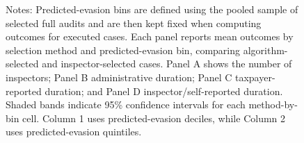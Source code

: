 \documentclass{article}
\begin{document}
\begin{figure}[H]
\begin{threeparttable}
\begin{tablenotes}
    \tiny \item Notes: Predicted-evasion bins are defined using the pooled sample of selected full audits and are then kept fixed when computing outcomes for executed cases. Each panel reports mean outcomes by selection method and predicted-evasion bin, comparing algorithm-selected and inspector-selected cases. Panel A shows the number of inspectors; Panel B administrative duration; Panel C taxpayer-reported duration; and Panel D inspector/self-reported duration. Shaded bands indicate 95\% confidence intervals for each method-by-bin cell. Column 1 uses predicted-evasion deciles, while Column 2 uses predicted-evasion quintiles.
    \end{tablenotes}
    \end{threeparttable}
\end{figure}
\end{document}
